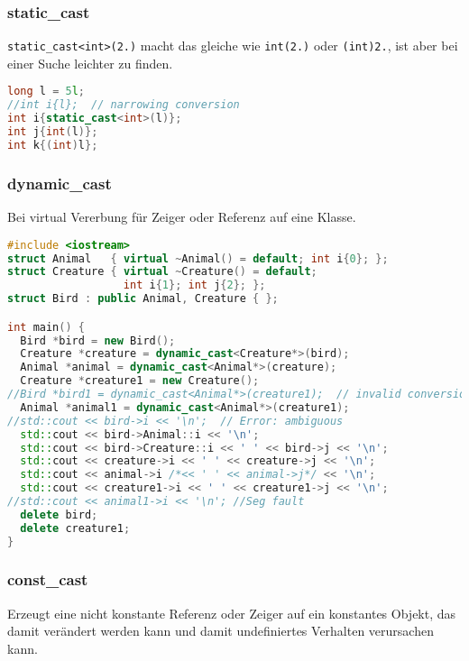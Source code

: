 \documentclass[10pt,twocolumn]{scrartcl}
\begin{document}
\subsubsection{static\_cast}

\lstinline|static_cast<int>(2.)| macht das gleiche wie \lstinline|int(2.)| oder
\lstinline|(int)2.|, ist aber bei einer Suche leichter zu finden.

\begin{lstlisting}[language=C++]
long l = 5l;
//int i{l};  // narrowing conversion
int i{static_cast<int>(l)};
int j{int(l)};
int k{(int)l};
\end{lstlisting}

\subsubsection{dynamic\_cast}

Bei virtual Vererbung für Zeiger oder Referenz auf eine Klasse.

\begin{lstlisting}[language=C++]
#include <iostream>
struct Animal   { virtual ~Animal() = default; int i{0}; };
struct Creature { virtual ~Creature() = default;
                  int i{1}; int j{2}; };
struct Bird : public Animal, Creature { };

int main() {
  Bird *bird = new Bird();
  Creature *creature = dynamic_cast<Creature*>(bird);
  Animal *animal = dynamic_cast<Animal*>(creature);
  Creature *creature1 = new Creature();
//Bird *bird1 = dynamic_cast<Animal*>(creature1);  // invalid conversion
  Animal *animal1 = dynamic_cast<Animal*>(creature1);
//std::cout << bird->i << '\n';  // Error: ambiguous
  std::cout << bird->Animal::i << '\n';
  std::cout << bird->Creature::i << ' ' << bird->j << '\n';
  std::cout << creature->i << ' ' << creature->j << '\n';
  std::cout << animal->i /*<< ' ' << animal->j*/ << '\n';
  std::cout << creature1->i << ' ' << creature1->j << '\n';
//std::cout << animal1->i << '\n'; //Seg fault
  delete bird;
  delete creature1;
}
\end{lstlisting}

\subsubsection{const\_cast}
\label{sec:Conversion:constCast}

Erzeugt eine nicht konstante Referenz oder Zeiger auf ein konstantes Objekt, das
damit verändert werden kann und damit undefiniertes Verhalten verursachen kann.
\end{document}
